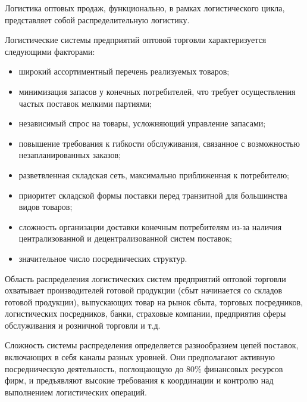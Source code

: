 Логистика оптовых продаж, функционально, в рамках логистического цикла, представляет собой распределительную логистику.

Логистические системы предприятий оптовой торговли характеризуется следующими факторами:
\begin{itemize}
	\item широкий ассортиментный перечень реализуемых товаров;
	\item минимизация запасов у конечных потребителей, что требует осуществления частых поставок мелкими партиями;
	\item независимый спрос на товары, усложняющий управление запасами;
	\item повышение требования к гибкости обслуживания, связанное с возможностью незапланированных заказов;
	\item разветвленная складская сеть, максимально приближенная к потребителю;
	\item приоритет складской формы поставки перед транзитной для большинства видов товаров;
	\item сложность организации доставки конечным потребителям из-за наличия централизованной и децентрализованной систем поставок;
	\item значительное число посреднических структур.
\end{itemize}

Область распределения логистических систем предприятий оптовой торговли охватывает производителей  готовой продукции (сбыт начинается со складов готовой продукции), выпускающих товар на рынок сбыта, торговых посредников, логистических посредников, банки, страховые компании, предприятия сферы обслуживания и розничной торговли и т.д. 

Сложность системы распределения определяется разнообразием цепей поставок, включающих в себя каналы разных уровней.
Они предполагают активную посредническую деятельность, поглощающую до 80\% финансовых ресурсов фирм, и предъявляют высокие требования к координации и контролю над выполнением логистических операций.

